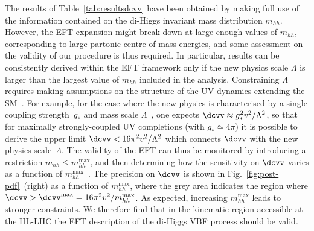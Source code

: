 The results of Table~\ref{tab:resultsdcvv}
have been obtained by making full use of the information
contained on the di-Higgs invariant mass distribution $m_{hh}$.
%
However, the EFT expansion might break down at large enough values of
$m_{hh}$, corresponding to large partonic centre-of-mass energies,
and some assessment on the validity of our procedure is thus required.
%
In particular, results can be consistently derived within the EFT
framework only if the new physics scale $\Lambda$ is larger than the largest value of $m_{hh}$ included in the analysis.
%
Constraining $\Lambda$
requires making assumptions on the structure of the UV dynamics extending the SM~\cite{Contino:2016jqw}.
%
For example, for the case where the new physics is characterised by a single 
coupling strength~$g_*$ and mass scale $\Lambda$~\cite{Giudice:2007fh}, one expects $
\dcvv \approx g_*^2 v^2/\Lambda^2$, so that
for maximally strongly-coupled UV completions (with $g_* \simeq 4\pi$)
it is possible to derive the upper limit
$\dcvv<16\pi^2 v^2/\Lambda^2$
which connects $\dcvv$ with the new physics scale~$\Lambda$.
%
The validity of the EFT can thus be monitored
by introducing a restriction $m_{hh} \leq  m_{hh}^\text{max}$, and
then determining how the sensitivity on $\dcvv$ varies as a function of 
$m_{hh}^\text{max}$~\cite{Contino:2016jqw}.
%
The precision on ${\dcvv}$
is shown in Fig.~\ref{fig:post-pdf}~(right) as a function of  $m_{hh}^{\max}$,
where the grey area indicates the region where $\dcvv > \dcvv^\text{max}=16\pi^2v^2/m_{hh}^\text{max}$.
%
As expected, increasing $m_{hh}^\text{max}$
leads to stronger constraints.
%
We therefore find that in the kinematic region accessible at the HL-LHC the
EFT description of the di-Higgs VBF process should be valid.
